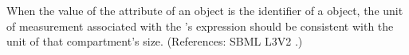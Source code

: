 When the value of the attribute  of an \EventAssignment
object is the identifier of a \Compartment object, the unit of measurement
associated with the \EventAssignment's  expression should be
consistent with the unit of that compartment's size.  (References: SBML
L3V2 .)
